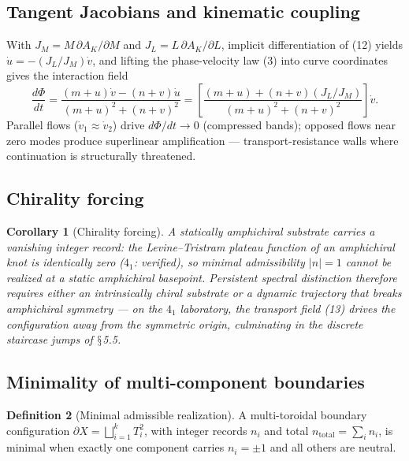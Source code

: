 \documentclass[11pt]{article}
\theoremstyle{definition}
\newtheorem{definition}{Definition}[section]
\theoremstyle{plain}
\newtheorem{corollary}[definition]{Corollary}
\begin{document}
\subsection{Tangent Jacobians and kinematic coupling}

With $J_M = M\,\partial A_K/\partial M$ and $J_L = L\,\partial A_K/\partial L$,
implicit differentiation of (12) yields $\dot u = -(J_L/J_M)\dot v$, and lifting
the phase-velocity law (3) into curve coordinates gives the interaction field
\begin{equation}
\frac{d\Phi}{dt} = \frac{(m+u)\dot v - (n+v)\dot u}{(m+u)^2 + (n+v)^2}
= \left[\frac{(m+u) + (n+v)(J_L/J_M)}{(m+u)^2 + (n+v)^2}\right]\dot v .
\end{equation}
Parallel flows ($\dot v_1 \approx \dot v_2$) drive $d\Phi/dt \to 0$ (compressed
bands); opposed flows near zero modes produce superlinear amplification ---
transport-resistance walls where continuation is structurally threatened.

\subsection{Chirality forcing}

\begin{corollary}[Chirality forcing]
A statically amphichiral substrate carries a vanishing integer record: the
Levine--Tristram plateau function of an amphichiral knot is identically zero
($4_1$: verified), so minimal admissibility $|n| = 1$ cannot be realized at a
static amphichiral basepoint. Persistent spectral distinction therefore requires
either an intrinsically chiral substrate or a dynamic trajectory that breaks
amphichiral symmetry --- on the $4_1$ laboratory, the transport field (13) drives
the configuration away from the symmetric origin, culminating in the discrete
staircase jumps of $\mathsection$5.5.
\end{corollary}

\subsection{Minimality of multi-component boundaries}

\begin{definition}[Minimal admissible realization]
A multi-toroidal boundary configuration
$\partial X = \bigsqcup_{i=1}^{k} T^2_i$, with integer records $n_i$ and total
$n_{\mathrm{total}} = \sum_i n_i$, is minimal when exactly one component carries
$n_i = \pm 1$ and all others are neutral.
\end{definition}
\end{document}
